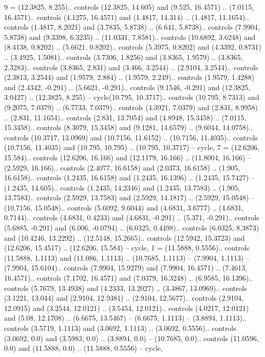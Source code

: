 {9} = {(12.3825, 8.255).. controls (12.3825, 14.605) and (9.525, 16.4571) .. (7.0115, 16.4571).. controls (4.1275, 16.4571) and (1.4817, 14.314) .. (1.4817, 11.1654).. controls (1.4817, 8.2021) and (3.7835, 5.8738) .. (6.641, 5.8738).. controls (7.9904, 5.8738) and (9.3398, 6.3235) .. (11.0331, 7.8581).. controls (10.6892, 3.6248) and (8.4138, 0.8202) .. (5.6621, 0.8202).. controls (5.3975, 0.8202) and (4.3392, 0.8731) .. (3.4925, 1.5081).. controls (3.7306, 1.8256) and (3.8365, 1.9579) .. (3.8365, 2.3283).. controls (3.8365, 2.831) and (3.466, 3.2544) .. (2.9104, 3.2544).. controls (2.3813, 3.2544) and (1.9579, 2.884) .. (1.9579, 2.249).. controls (1.9579, 1.4288) and (2.4342, -0.291) .. (5.6621, -0.291).. controls (9.1546, -0.291) and (12.3825, 3.0427) .. (12.3825, 8.255) -- cycle(10.795, 10.3717).. controls (10.795, 8.7313) and (9.2075, 7.0379) .. (6.7733, 7.0379).. controls (4.3921, 7.0379) and (2.831, 8.9958) .. (2.831, 11.1654).. controls (2.831, 13.7054) and (4.8948, 15.3458) .. (7.0115, 15.3458).. controls (8.3079, 15.3458) and (9.1281, 14.6579) .. (9.6044, 14.0758).. controls (10.3717, 13.0969) and (10.7156, 11.6152) .. (10.7156, 11.4035).. controls (10.7156, 11.4035) and (10.795, 10.795) .. (10.795, 10.3717) -- cycle},
{7} = {(12.6206, 15.584).. controls (12.6206, 16.166) and (12.1179, 16.166) .. (11.8004, 16.166) -- (2.5929, 16.166).. controls (2.4077, 16.6158) and (2.0373, 16.6158) .. (1.905, 16.6158).. controls (1.2435, 16.6158) and (1.2435, 16.1396) .. (1.2435, 15.7427) -- (1.2435, 14.605).. controls (1.2435, 14.2346) and (1.2435, 13.7583) .. (1.905, 13.7583).. controls (2.5929, 13.7583) and (2.5929, 14.1817) .. (2.5929, 15.0548) -- (10.7156, 15.0548).. controls (5.6092, 9.6044) and (4.6831, 3.6777) .. (4.6831, 0.7144).. controls (4.6831, 0.4233) and (4.6831, -0.291) .. (5.371, -0.291).. controls (5.6885, -0.291) and (6.006, -0.0794) .. (6.0325, 0.4498).. controls (6.0325, 8.3873) and (10.4246, 13.2292) .. (12.5148, 15.2665).. controls (12.5942, 15.3723) and (12.6206, 15.4517) .. (12.6206, 15.584) -- cycle},
{1} = {(11.5888, 0.5556).. controls (11.5888, 1.1113) and (11.086, 1.1113) .. (10.7685, 1.1113) -- (7.9904, 1.1113) -- (7.9904, 15.6104).. controls (7.9904, 15.9279) and (7.9904, 16.4571) .. (7.4613, 16.4571).. controls (7.1702, 16.4571) and (7.0379, 16.3248) .. (6.9585, 16.1396).. controls (5.7679, 13.4938) and (4.2333, 13.2027) .. (3.3867, 13.0969).. controls (3.1221, 13.044) and (2.9104, 12.9381) .. (2.9104, 12.5677).. controls (2.9104, 12.0915) and (3.2544, 12.0121) .. (3.5454, 12.0121).. controls (4.0217, 12.0121) and (5.08, 12.1708) .. (6.6675, 13.5467) -- (6.6675, 1.1113) -- (3.8894, 1.1113).. controls (3.5719, 1.1113) and (3.0692, 1.1113) .. (3.0692, 0.5556).. controls (3.0692, 0.0) and (3.5983, 0.0) .. (3.8894, 0.0) -- (10.7685, 0.0).. controls (11.0596, 0.0) and (11.5888, 0.0) .. (11.5888, 0.5556) -- cycle},
